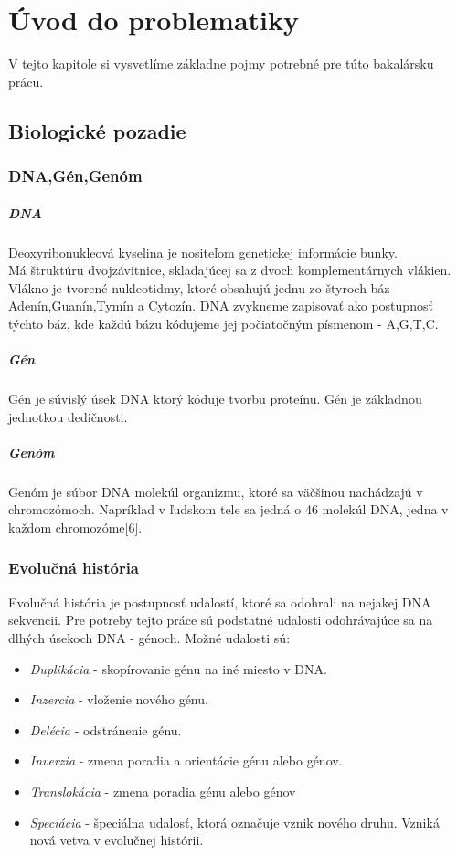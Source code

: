 \chapter{Úvod do problematiky}
V tejto kapitole si vysvetlíme základne pojmy potrebné pre túto bakalársku prácu.
\section{Biologické pozadie}
\subsection{DNA,Gén,Genóm}
\paragraph{DNA}
Deoxyribonukleová kyselina je nositeľom genetickej informácie bunky.\\
Má štruktúru dvojzávitnice, skladajúcej sa z dvoch komplementárnych vlákien.
Vlákno je tvorené nukleotidmy, ktoré obsahujú jednu zo štyroch báz Adenín,Guanín,Tymín a Cytozín.
DNA zvykneme zapisovať ako postupnosť týchto báz, kde každú bázu kódujeme jej počiatočným písmenom - A,G,T,C.

\paragraph{Gén}
Gén je súvislý úsek DNA ktorý kóduje tvorbu proteínu. Gén je základnou jednotkou dedičnosti.

\paragraph{Genóm}
Genóm je súbor DNA molekúl organizmu, ktoré sa väčšinou nachádzajú v chromozómoch.
Napríklad v ľudskom tele sa jedná o 46 molekúl DNA, jedna v každom chromozóme[6].
\subsection{Evolučná história}\label{evhist}
Evolučná história je postupnosť udalostí, ktoré sa odohrali na nejakej DNA sekvencii.
Pre potreby tejto práce sú podstatné udalosti odohrávajúce sa na dlhých úsekoch DNA - génoch.
\newline
Možné udalosti sú:
\newline
\begin{itemize}
\item \emph{Duplikácia} - skopírovanie génu na iné miesto v DNA.
\item \emph{Inzercia} - vloženie nového génu.
\item \emph{Delécia} - odstránenie génu.
\item \emph{Inverzia} - zmena poradia a orientácie génu alebo génov.
\item \emph{Translokácia} - zmena poradia génu alebo génov 
\item \emph{Speciácia} - špeciálna udalosť, ktorá označuje vznik nového druhu. Vzniká nová vetva v evolučnej histórii.
\end{itemize}
